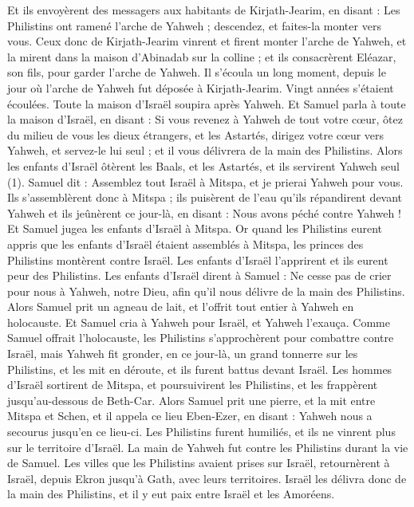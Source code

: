 \begin{multicols}{2}
Et ils envoyèrent des messagers aux habitants de Kirjath-Jearim, en disant : Les Philistins ont ramené l'arche de Yahweh ; descendez, et faites-la monter vers vous.
\VerseOne{}Ceux donc de Kirjath-Jearim vinrent et firent monter l'arche de Yahweh, et la mirent dans la maison d'Abinadab sur la colline ; et ils consacrèrent Eléazar, son fils, pour garder l'arche de Yahweh.
Il s’écoula un long moment, depuis le jour où l'arche de Yahweh fut déposée à Kirjath-Jearim. Vingt années s’étaient écoulées. Toute la maison d'Israël soupira après Yahweh.
Et Samuel parla à toute la maison d'Israël, en disant : Si vous revenez à Yahweh de tout votre cœur, ôtez du milieu de vous les dieux étrangers, et les Astartés, dirigez votre cœur vers Yahweh, et servez-le lui seul ; et il vous délivrera de la main des Philistins.
Alors les enfants d'Israël ôtèrent les Baals, et les Astartés, et ils servirent Yahweh seul (1).
Samuel dit : Assemblez tout Israël à Mitspa, et je prierai Yahweh pour vous.
Ils s'assemblèrent donc à Mitspa ; ils puisèrent de l'eau qu'ils répandirent devant Yahweh et ils jeûnèrent ce jour-là, en disant : Nous avons péché contre Yahweh ! Et Samuel jugea les enfants d'Israël à Mitspa.
Or quand les Philistins eurent appris que les enfants d'Israël étaient assemblés à Mitspa, les princes des Philistins montèrent contre Israël. Les enfants d'Israël l’apprirent et ils eurent peur des Philistins.
Les enfants d'Israël dirent à Samuel : Ne cesse pas de crier pour nous à Yahweh, notre Dieu, afin qu'il nous délivre de la main des Philistins.
Alors Samuel prit un agneau de lait, et l'offrit tout entier à Yahweh en holocauste. Et Samuel cria à Yahweh pour Israël, et Yahweh l'exauça.
Comme Samuel offrait l'holocauste, les Philistins s'approchèrent pour combattre contre Israël, mais Yahweh fit gronder, en ce jour-là, un grand tonnerre sur les Philistins, et les mit en déroute, et ils furent battus devant Israël.
Les hommes d'Israël sortirent de Mitspa, et poursuivirent les Philistins, et les frappèrent jusqu'au-dessous de Beth-Car.
Alors Samuel prit une pierre, et la mit entre Mitspa et Schen, et il appela ce lieu Eben-Ezer, en disant : Yahweh nous a secourus jusqu'en ce lieu-ci.
Les Philistins furent humiliés, et ils ne vinrent plus sur le territoire d'Israël. La main de Yahweh fut contre les Philistins durant la vie de Samuel.
Les villes que les Philistins avaient prises sur Israël, retournèrent à Israël, depuis Ekron jusqu'à Gath, avec leurs territoires. Israël les délivra donc de la main des Philistins, et il y eut paix entre Israël et les Amoréens.

\end{multicols}
